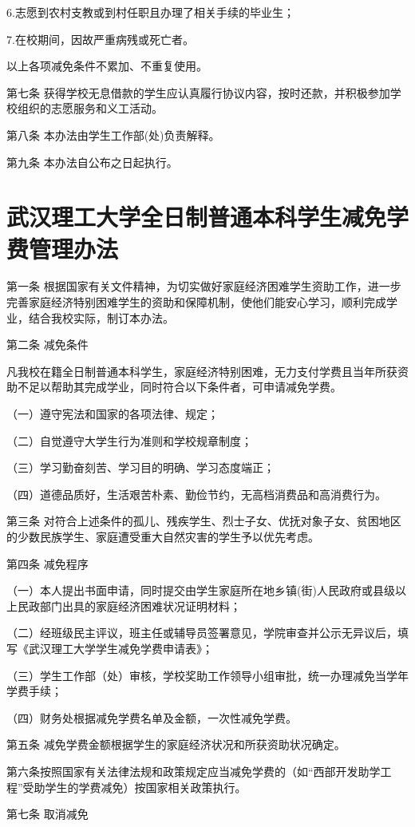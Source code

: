 \documentclass[UTF8,12pt,a4paper]{report}
\begin{document}
6.志愿到农村支教或到村任职且办理了相关手续的毕业生；

7.在校期间，因故严重病残或死亡者。

以上各项减免条件不累加、不重复使用。

第七条 获得学校无息借款的学生应认真履行协议内容，按时还款，并积极参加学校组织的志愿服务和义工活动。

第八条 本办法由学生工作部(处)负责解释。

第九条 本办法自公布之日起执行。

\chapter{武汉理工大学全日制普通本科学生减免学费管理办法}
第一条 根据国家有关文件精神，为切实做好家庭经济困难学生资助工作，进一步完善家庭经济特别困难学生的资助和保障机制，使他们能安心学习，顺利完成学业，结合我校实际，制订本办法。

第二条 减免条件

凡我校在籍全日制普通本科学生，家庭经济特别困难，无力支付学费且当年所获资助不足以帮助其完成学业，同时符合以下条件者，可申请减免学费。

（一）遵守宪法和国家的各项法律、规定；

（二）自觉遵守大学生行为准则和学校规章制度；

（三）学习勤奋刻苦、学习目的明确、学习态度端正；

（四）道德品质好，生活艰苦朴素、勤俭节约，无高档消费品和高消费行为。

第三条 对符合上述条件的孤儿、残疾学生、烈士子女、优抚对象子女、贫困地区的少数民族学生、家庭遭受重大自然灾害的学生予以优先考虑。

第四条 减免程序

（一）本人提出书面申请，同时提交由学生家庭所在地乡镇(街)人民政府或县级以上民政部门出具的家庭经济困难状况证明材料；

（二）经班级民主评议，班主任或辅导员签署意见，学院审查并公示无异议后，填写《武汉理工大学学生减免学费申请表》；

（三）学生工作部（处）审核，学校奖助工作领导小组审批，统一办理减免当学年学费手续；

（四）财务处根据减免学费名单及金额，一次性减免学费。

第五条 减免学费金额根据学生的家庭经济状况和所获资助状况确定。

第六条按照国家有关法律法规和政策规定应当减免学费的（如“西部开发助学工程”受助学生的学费减免）按国家相关政策执行。

第七条 取消减免
\end{document}
